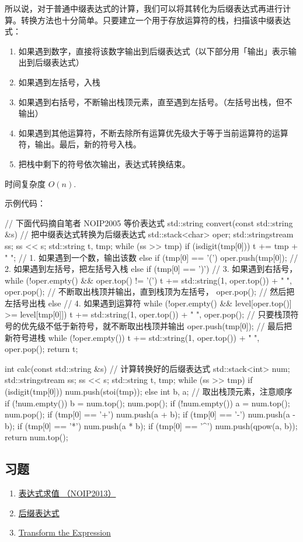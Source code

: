 所以说，对于普通中缀表达式的计算，我们可以将其转化为后缀表达式再进行计算。转换方法也十分简单。只要建立一个用于存放运算符的栈，扫描该中缀表达式：

\begin{enumerate}
\item 如果遇到数字，直接将该数字输出到后缀表达式（以下部分用「输出」表示输出到后缀表达式）
\item 如果遇到左括号，入栈
\item 如果遇到右括号，不断输出栈顶元素，直至遇到左括号。（左括号出栈，但不输出）
\item 如果遇到其他运算符，不断去除所有运算优先级大于等于当前运算符的运算符，输出。最后，新的符号入栈。
\item 把栈中剩下的符号依次输出，表达式转换结束。
\end{enumerate}

时间复杂度 $O(n)$.

示例代码：

\begin{cppcode}
// 下面代码摘自笔者 NOIP2005 等价表达式
std::string convert(const std::string &s) {  // 把中缀表达式转换为后缀表达式
  std::stack<char> oper;
  std::stringstream ss;
  ss << s;
  std::string t, tmp;
  while (ss >> tmp) {
    if (isdigit(tmp[0]))
      t += tmp + " ";  // 1. 如果遇到一个数，输出该数
    else if (tmp[0] == '(')
      oper.push(tmp[0]);       // 2. 如果遇到左括号，把左括号入栈
    else if (tmp[0] == ')') {  // 3. 如果遇到右括号，
      while (!oper.empty() && oper.top() != '(')
        t += std::string(1, oper.top()) + " ",
            oper.pop();  // 不断取出栈顶并输出，直到栈顶为左括号，
      oper.pop();        // 然后把左括号出栈
    } else {             // 4. 如果遇到运算符
      while (!oper.empty() && level[oper.top()] >= level[tmp[0]])
        t += std::string(1, oper.top()) + " ",
            oper.pop();  // 只要栈顶符号的优先级不低于新符号，就不断取出栈顶并输出
      oper.push(tmp[0]);  // 最后把新符号进栈
    }
  }
  while (!oper.empty()) t += std::string(1, oper.top()) + " ", oper.pop();
  return t;
}

int calc(const std::string &s) {  // 计算转换好的后缀表达式
  std::stack<int> num;
  std::stringstream ss;
  ss << s;
  std::string t, tmp;
  while (ss >> tmp) {
    if (isdigit(tmp[0]))
      num.push(stoi(tmp));
    else {
      int b, a;  // 取出栈顶元素，注意顺序
      if (!num.empty()) b = num.top();
      num.pop();
      if (!num.empty()) a = num.top();
      num.pop();
      if (tmp[0] == '+') num.push(a + b);
      if (tmp[0] == '-') num.push(a - b);
      if (tmp[0] == '*') num.push(a * b);
      if (tmp[0] == '^') num.push(qpow(a, b));
    }
  }
  return num.top();
}
\end{cppcode}

\subsection{习题}

\begin{enumerate}
\item \href{https://www.luogu.org/problemnew/show/P1981}{表达式求值 （NOIP2013）}
\item \href{https://www.luogu.org/problemnew/show/P1449}{后缀表达式}
\item \href{https://www.spoj.com/problems/ONP/}{Transform the Expression}
\end{enumerate}
